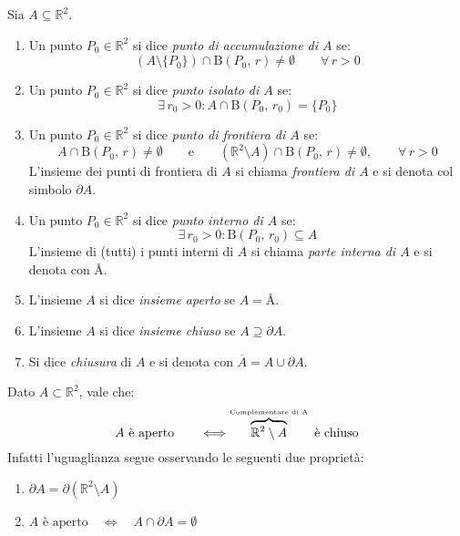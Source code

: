 \begin{center}
\def\svgwidth{6cm}

\end{center}

\begin{definition}
Sia $A \subseteq \mathbb{R}^2$.
\begin{enumerate}[labelindent=\parindent,leftmargin=*,label=\textnormal{(\roman*)},start=1]
\item Un punto $P_0 \in \mathbb{R}^2$ si dice \emph{punto di accumulazione di $A$} se:
$$(A \setminus \lbrace P_0 \rbrace) \cap \mathrm{B}(P_0,\, r) \neq \emptyset \qquad \forall \, r>0$$
\item Un punto $P_0 \in \mathbb{R}^2$ si dice \emph{punto isolato di $A$} se:
$$\exists \, r_0 > 0 : A \cap \mathrm{B}(P_0,\, r_0) = \lbrace P_0 \rbrace$$
\item Un punto $P_0 \in \mathbb{R}^2$ si dice \emph{punto di frontiera di $A$} se:
$$A \cap \mathrm{B}(P_0,\, r) \neq \emptyset \qquad \text{e} \qquad (\mathbb{R}^2 \setminus A) \cap \mathrm{B}(P_0,\, r) \neq \emptyset, \qquad \forall \, r>0$$
L'insieme dei punti di frontiera di $A$ si chiama \emph{frontiera di $A$} e si denota col simbolo $\partial A$.
\item Un punto $P_0 \in \mathbb{R}^2$ si dice \emph{punto interno di $A$} se:
$$\exists \, r_0 > 0 : \mathrm{B}(P_0,\, r_0) \subseteq A$$
L'insieme di (tutti) i punti interni di $A$ si chiama \emph{parte interna di $A$} e si denota con \AA.
\item L'insieme $A$ si dice \emph{insieme aperto} se $A=\text{\AA}$.
\item L'insieme $A$ si dice \emph{insieme chiuso} se $A \supseteq \partial A$.
\item Si dice \emph{chiusura} di $A$ e si denota con $\overline{A} = A \cup \partial A$.
\end{enumerate}
\end{definition}

\begin{center}
\def\svgwidth{10cm}

\end{center}

\begin{obs}
Dato $A \subset \mathbb{R}^2$, vale che:
$$A\text{ è aperto} \qquad \Longleftrightarrow \overbrace{\mathbb{R}^2 \setminus A}^{\text{\tiny Complementare di A}} \text{ è chiuso}$$
Infatti l'uguaglianza segue osservando le seguenti due proprietà:
\begin{enumerate}[labelindent=\parindent,leftmargin=*,label=\textnormal{(\arabic*)},start=1]
\item $\partial A = \partial (\mathbb{R}^2 \setminus A)$
\item $A\text{ è aperto} \quad \Longleftrightarrow \quad A \cap \partial A = \emptyset$
\end{enumerate}
\end{obs}

